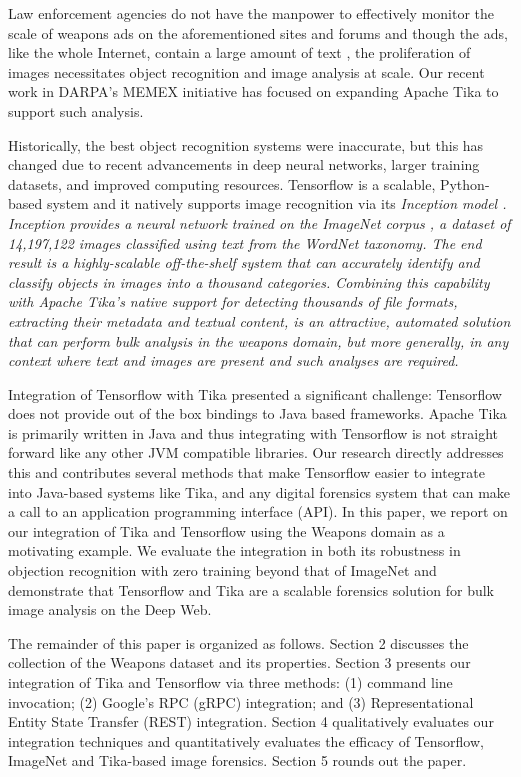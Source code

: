 Law enforcement agencies do not have the manpower to effectively monitor the scale of weapons ads on the aforementioned sites and forums and though the ads, like the whole Internet, contain a large amount of text \cite{mphillips-EOT2012}, the proliferation of images necessitates object recognition and image analysis at scale. Our recent work in DARPA's MEMEX initiative has focused on expanding Apache Tika to support such analysis.

Historically, the best object recognition systems were inaccurate, but this has changed due to recent advancements in deep neural networks, larger training datasets, and improved computing resources. Tensorflow is a scalable, Python-based system and it natively supports image recognition via its \em {Inception} model \cite{abadi2016tensorflow}. \em{Inception} provides a neural network trained on the ImageNet corpus \cite{krizhevsky2012imagenet}, a dataset of 14,197,122 images classified using text from the WordNet taxonomy. The end result is a highly-scalable off-the-shelf system that can accurately identify and classify objects in images into a thousand categories. Combining this capability with Apache Tika's native support for detecting thousands of file formats, extracting their metadata and textual content, is an attractive, automated solution that can perform bulk analysis in the weapons domain, but more generally, in any context where text and images are present and such analyses are required.

Integration of Tensorflow with Tika presented a significant challenge: Tensorflow does not provide out of the box bindings to Java based frameworks. Apache Tika is primarily written in Java and thus integrating with Tensorflow is not straight forward like any other JVM compatible libraries. Our research directly addresses this and contributes several methods that make Tensorflow easier to integrate into Java-based systems like Tika, and any digital forensics system that can make a call to an application programming interface (API). In this paper, we report on our integration of Tika and Tensorflow using the Weapons domain as a motivating example. We evaluate the integration in both its robustness in objection recognition with zero training beyond that of ImageNet and demonstrate that Tensorflow and Tika are a scalable forensics solution for bulk image analysis on the Deep Web.

The remainder of this paper is organized as follows. Section 2 discusses the collection of the Weapons dataset and its properties. Section 3 presents our integration of Tika and Tensorflow via three methods: (1) command line invocation; (2) Google's RPC (gRPC) integration; and (3) Representational Entity State Transfer (REST) \cite{Fielding:2000:ASD:932295} integration. Section 4 qualitatively evaluates our integration techniques and quantitatively evaluates the efficacy of Tensorflow, ImageNet and Tika-based image forensics. Section 5 rounds out the paper.

